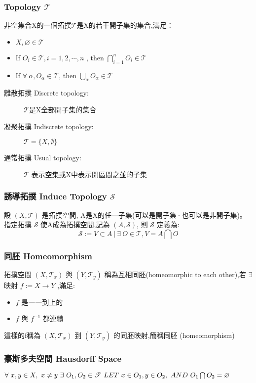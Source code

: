 \documentclass{article}
\begin{document}
\begin{CJK}{UTF8}{bsmi}
\subsubsection{Topology $\mathscr{T}$}
非空集合X的一個拓撲$\mathscr{T}$是X的若干開子集的集合,滿足：
\begin{itemize}
  \item $X, \varnothing \in \mathscr{T}$
  \item If $O_i\in \mathscr{T}, i=1,2, \cdots, n$ , then $\bigcap_{i=1}^n O_i \in \mathscr{T}$
  \item If $ \forall \ \alpha,O_{\alpha}\in \mathscr{T} $, then $\bigcup_\alpha O_\alpha \in  \mathscr{T}$
\end{itemize}
 \begin{description}
  \item[離散拓撲 Discrete topology:]$\mathscr{T}$是X全部開子集的集合
  \item[凝聚拓撲 Indiscrete topology:] $\mathscr{T}=\{X,\emptyset\}$
  \item[通常拓撲 Usual topology:]$\mathscr{T}$ 表示空集或X中表示開區間之並的子集
\end{description}
\subsubsection{誘導拓撲 Induce Topology $\mathscr{S}$}
設 $(X,\mathscr{T})$ 是拓撲空間, A是X的任一子集(可以是開子集·也可以是非開子集)。\\
指定拓撲 $\mathscr{S}$ 使A成為拓撲空間,記為 $(A,\mathscr{S})$, 則 $\mathscr{S}$ 定義為: $$\mathscr{S}:={V \subset A \ |\ \exists \ O \in \mathscr{T}, V=A \bigcap O}  $$
\subsubsection{同胚 Homeomorphism}
拓撲空間 $(X,\mathscr{T}_x)$ 與 $(Y,\mathscr{T}_y)$ 稱為互相同胚(homeomorphic to each other),若 $\exists$ 映射 $f:=X\rightarrow Y$ ,滿足:
\begin{itemize}
  \item $f$ 是一一到上的
  \item $f$ 與 $f^{-1}$ 都連續
\end{itemize}
這樣的f稱為  $(X,\mathscr{T}_x)$ 到 $(Y,\mathscr{T}_y)$  的同胚映射,簡稱同胚 (homeomorphism)
\subsubsection{豪斯多夫空間 Hausdorff Space}
$\forall\ x,y \in X,\ x\neq y\\\ \exists\ O_1, O_2 \in \mathscr{T}\\\ LET\  x \in O_1,y\in O_2 ,\ AND\ O_1 \bigcap O_2 =\varnothing$
\newpage


\end{CJK}
\end{document}
